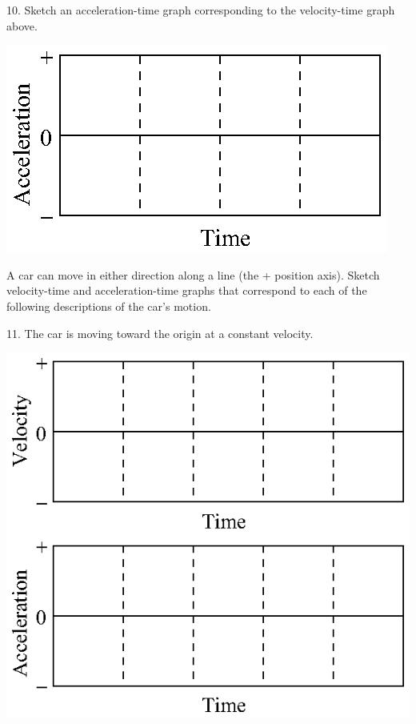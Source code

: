 10. Sketch an acceleration-time graph corresponding to the velocity-time graph
above.

\vspace{0.3cm}
{\par\centering \includegraphics{slowing/slowing_fig14.eps} \par}
\vspace{0.3cm}

A car can move in either direction along a line (the + position axis). Sketch
velocity-time and acceleration-time graphs that correspond to each of the following
descriptions of the car's motion.

11. The car is moving toward the origin at a constant velocity.

\vspace{0.3cm}
{\par\centering \includegraphics{slowing/slowing_fig15.eps} \par}
\vspace{0.3cm}

